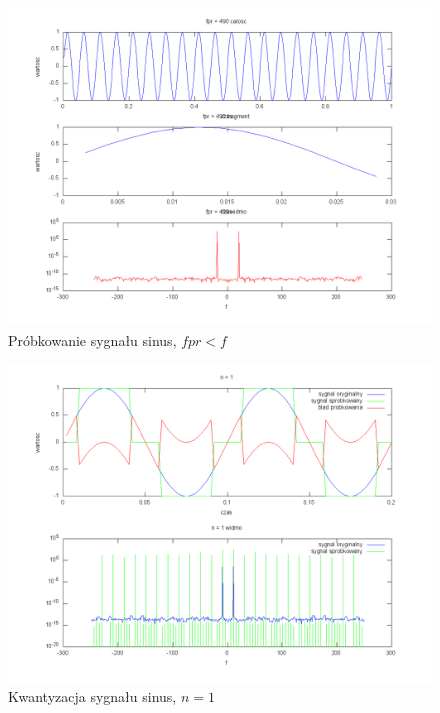 \documentclass[wide,a4paper,titlepage,12pt]{mwart}
\begin{document}
	\begin{landscape}
	  \begin{figure}[htbp]
	    \begin{center}
	      \includegraphics[scale=.5]{out/prob3.png}
	      \caption{\label{prob3} Próbkowanie sygnału sinus, $fpr < f$}
	    \end{center}
	  \end{figure}
	\end{landscape}
	
	
	\begin{landscape}
	  \begin{figure}[htbp]
	    \begin{center}
	      \includegraphics[scale=.5]{out/kwant1-1.png}
	      \caption{\label{kwant1-1} Kwantyzacja sygnału sinus, $n=1$}
	    \end{center}
	  \end{figure}
	\end{landscape}
\end{document}
